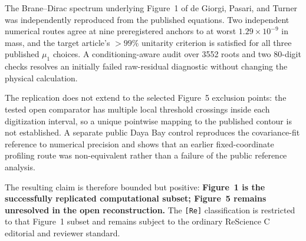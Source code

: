 The Brane--Dirac spectrum underlying Figure~1 of de Giorgi, Pasari, and Turner was independently reproduced from the published equations. Two independent numerical routes agree at nine preregistered anchors to at worst $1.29\times10^{-9}$ in mass, and the target article's $>99\%$ unitarity criterion is satisfied for all three published $\mu_1$ choices. A conditioning-aware audit over 3552 roots and two 80-digit checks resolves an initially failed raw-residual diagnostic without changing the physical calculation.

The replication does not extend to the selected Figure~5 exclusion points: the tested open comparator has multiple local threshold crossings inside each digitization interval, so a unique pointwise mapping to the published contour is not established. A separate public Daya Bay control reproduces the covariance-fit reference to numerical precision and shows that an earlier fixed-coordinate profiling route was non-equivalent rather than a failure of the public reference analysis.

The resulting claim is therefore bounded but positive: \textbf{Figure~1 is the successfully replicated computational subset; Figure~5 remains unresolved in the open reconstruction.} The \texttt{[Re]} classification is restricted to that Figure~1 subset and remains subject to the ordinary ReScience C editorial and reviewer standard.
